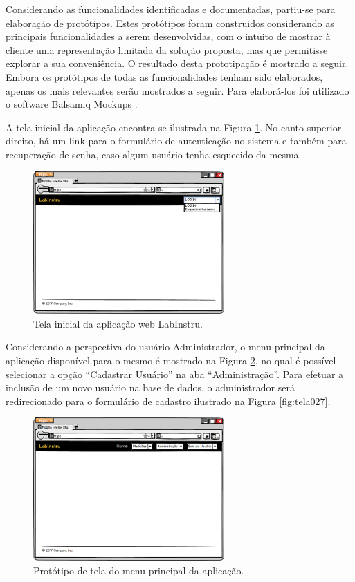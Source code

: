 Considerando as funcionalidades identificadas e documentadas, partiu-se para elaboração de protótipos. Estes protótipos foram construidos considerando as principais funcionalidades a serem desenvolvidas, com o intuito de mostrar à cliente uma representação limitada da solução proposta, mas que permitisse explorar a sua conveniência. O resultado desta prototipação é mostrado a seguir. Embora os protótipos de todas as funcionalidades tenham sido elaborados, apenas os mais relevantes serão mostrados a seguir. Para elaborá-los foi utilizado o software Balsamiq Mockups \cite{Prototipacao:Mockups}.

A tela inicial da aplicação encontra-se ilustrada na Figura  \ref{fig:tela002}. No canto superior direito, há um link para o formulário de autenticação no sistema e também para recuperação de senha, caso algum usuário tenha esquecido da mesma.

\begin{figure}[H]
	\centering
	\includegraphics[width=0.65\textwidth]{./img/telas/tela002.png}
	\caption{Tela inicial da aplicação web LabInstru.} \label{fig:tela002}
\end{figure}

Considerando a perspectiva do usuário Administrador, o menu principal da aplicação disponível para o mesmo é mostrado na Figura \ref{fig:tela025}, no qual é possível selecionar a opção ``Cadastrar Usuário'' na aba ``Administração''.  Para efetuar a inclusão de um novo usuário na base de dados, o administrador será redirecionado para o formulário de cadastro ilustrado na Figura \ref{fig:tela027}.


\begin{figure}[H]
	\centering
	\includegraphics[width=0.65\textwidth]{./img/telas/tela025.png}
	\caption{Protótipo de tela do menu principal da aplicação.} \label{fig:tela025}
\end{figure}


